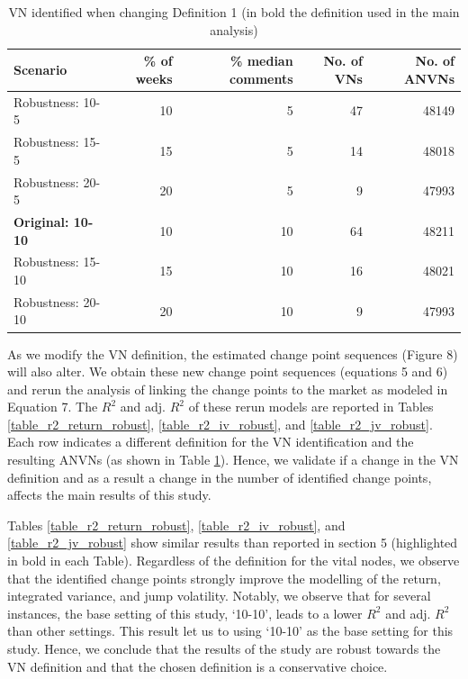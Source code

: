 \begin{table}
	\caption{VN identified when changing Definition 1 (in bold the definition used in the main analysis)}
	\label{tab:robust_vn_def}
	\centering
	\begin{tabular}[t]{l rrrr}
		\hline \hline
		Scenario & \% of weeks & \% median comments & No. of VNs & No. of ANVNs\\
		\hline
		Robustness: 10-5 & 10 & 5 & 47 & 48149\\
		Robustness: 15-5 & 15 & 5 & 14 & 48018\\
		Robustness: 20-5 & 20 & 5 & 9 & 47993\\
		\textbf{Original: 10-10} & 10 & 10 & 64 & 48211\\
		Robustness: 15-10 & 15 & 10 & 16 & 48021\\
		Robustness: 20-10 & 20 & 10 & 9 & 47993\\
		\hline
	\end{tabular}
\end{table}

As we modify the VN definition, the estimated change point sequences (Figure 8) will also alter. We obtain these new change point sequences (equations 5 and 6) and rerun the analysis of linking the change points to the market as modeled in Equation 7. The $R^2$ and adj. $R^2$ of these rerun models are reported in Tables \ref{table_r2_return_robust}, \ref{table_r2_iv_robust}, and \ref{table_r2_jv_robust}. Each row indicates a different definition for the VN identification and the resulting ANVNs (as shown in Table \ref{tab:robust_vn_def}). Hence, we validate if a change in the VN definition and as a result a  change in the number of identified change points, affects the main results of this study. 

Tables \ref{table_r2_return_robust}, \ref{table_r2_iv_robust}, and \ref{table_r2_jv_robust} show similar results than reported in section 5 (highlighted in bold in each Table). Regardless of the definition for the vital nodes, we observe that the identified change points strongly improve the modelling of the return, integrated variance, and jump volatility. Notably, we observe that for several instances, the base setting of this study, `10-10', leads to a lower $R^2$ and adj. $R^2$ than other settings. This result let us to using `10-10' as the base setting for this study. Hence, we conclude that the results of the study are robust towards the VN definition and that the chosen definition is a conservative choice.

